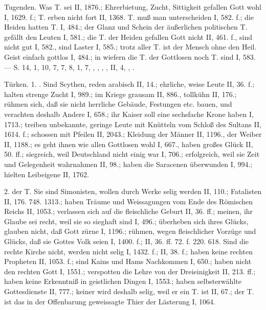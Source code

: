 Tugenden. Was T. sei II, 1876.; Ehrerbietung, Zucht, Sittigkeit gefallen Gott wohl I, 1629. f.; T. erben nicht fort II, 1368. T.  muß man unterscheiden I, 582. f.; die Heiden hatten T. I, 484.; der Glanz und Schein der äußerlichen politischen T. gefällt den Leuten I, 581.; die T. der Heiden gefallen Gott nicht II, 461. f., sind nicht gut I, 582., sind Laster I, 585.; trotz aller T. ist der Mensch ohne den Heil. Geist einfach gottlos I, 484.; in wiefern die T. der Gottlosen noch T. sind I, 583. — S.  14,  1,  10,  7,  7,  8,  1,  7, , , , ,  II, 4, , .

Türken. 1. . Sind Scythen, reden arabisch II, 14.; ehrliche, weise Leute II, 36. f.; halten strenge Zucht I, 989.; im Kriege grausam II, 886., tollkühn II, 176.; rühmen sich, daß sie nicht herrliche Gebäude, Festungen etc. bauen, und verachten deshalb Andere I, 658.; ihr Kaiser soll eine sechsfache Krone haben I, 1713.; treiben unbekannte, geringe Leute mit Knütteln vom Schloß des Sultans II, 1614. f.; schossen mit Pfeilen II, 2043.; Kleidung der Männer II, 1196., der Weiber II, 1188.; es geht ihnen wie allen Gottlosen wohl I, 667., haben großes Glück II, 50. ff.; siegreich, weil Deutschland nicht einig war I, 706.; erfolgreich, weil sie Zeit und Gelegenheit wahrnahmen II, 98.; haben die Saracenen überwunden I, 994.; hielten Leibeigene II, 1762.

2.  der T. Sie sind Simonisten, wollen durch Werke selig werden II, 110.; Fatalisten II, 176. 748. 1313.; haben Träume und Weissagungen vom Ende des Römischen Reichs II, 1053.; verlassen sich auf die fleischliche Geburt II, 36. ff.; meinen, ihr Glaube sei recht, weil sie so sieghaft sind I, 496.; überheben sich ihres Glücks, glauben nicht, daß Gott zürne I, 1196.; rühmen, wegen fleischlicher Vorzüge und Glücks, daß sie Gottes Volk seien I, 1400. f.; II, 36. ff. 72. f. 220. 618. Sind die rechte Kirche nicht, werden nicht selig I, 1432. f.; II, 38. f.; haben keine rechten Propheten II, 1053. f.; sind Kains und Hams Nachkommen I, 650.; haben nicht den rechten Gott I, 1551.; verspotten die Lehre von der Dreieinigkeit II, 213. ff.; haben keine Erkenntniß in geistlichen Dingen I, 1553.; haben selbsterwählte Gottesdienste II, 777.; keiner wird deshalb selig, weil er ein T. ist II, 67.; der T. ist das in der Offenbarung geweissagte Thier der Lästerung I, 1064.

